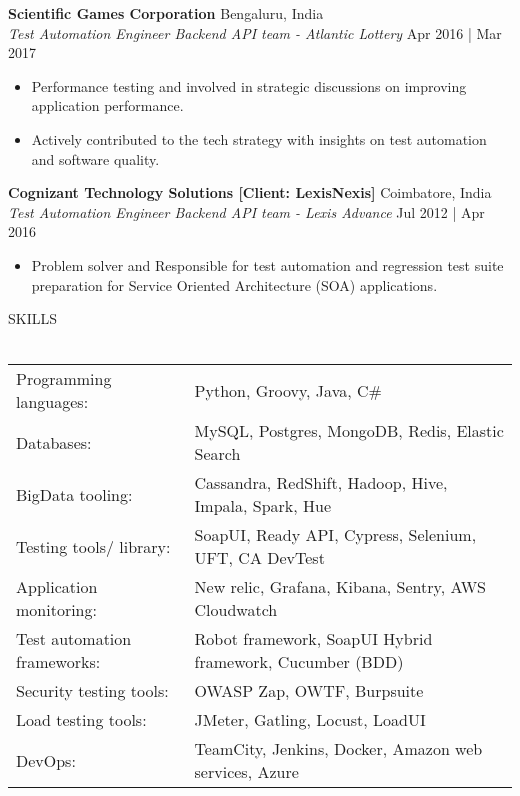 \documentclass[a4paper]{article}
\newcommand{\lineunder} {
    \vspace*{-8pt} \\
    \hspace*{-18pt} \hrulefill \\
}
\newcommand{\header} [1] {
    {\hspace*{-18pt}\vspace*{6pt} \textsc{#1}}
    \vspace*{-6pt} \lineunder
}
\begin{document}
\textbf{Scientific Games Corporation} \hfill Bengaluru, India\\
\textit{Test Automation Engineer \textbar{} Backend API team - Atlantic Lottery} \hfill Apr 2016 | Mar 2017\\
\vspace{-1.5mm}
\begin{itemize} \itemsep 1pt
	\item Performance testing and involved in strategic discussions on improving application performance.
	\item Actively contributed to the tech strategy with insights on test automation and software quality.
\end{itemize}

\textbf{Cognizant Technology Solutions [Client: LexisNexis]} \hfill Coimbatore, India\\
\textit{Test Automation Engineer \textbar{} Backend API team - Lexis Advance} \hfill Jul 2012 | Apr 2016\\
\vspace{-1.5mm}
\begin{itemize} \itemsep 1pt
	\item Problem solver and Responsible for test automation and regression test suite preparation for Service Oriented Architecture (SOA) applications. 
\end{itemize}

\header{SKILLS}
\begin{tabular}{ l l }
	Programming languages:      & Python, Groovy, Java, C\#                                            \\
	Databases:                  & MySQL, Postgres, MongoDB, Redis, Elastic Search         \\
	BigData tooling:                  & Cassandra, RedShift, Hadoop, Hive, Impala, Spark, Hue         \\
	Testing tools/ library:     & SoapUI, Ready API, Cypress, Selenium, UFT, CA DevTest             \\
	Application monitoring:     & New relic, Grafana, Kibana, Sentry, AWS Cloudwatch                \\
	Test automation frameworks: & Robot framework, SoapUI Hybrid framework, Cucumber (BDD)          \\
	Security testing tools:     & OWASP Zap, OWTF, Burpsuite                                        \\
	Load testing tools:         & JMeter, Gatling, Locust, LoadUI                                   \\
	DevOps:                     & TeamCity, Jenkins, Docker, Amazon web services, Azure \\
\end{tabular}
\vspace{2mm}
\end{document}
